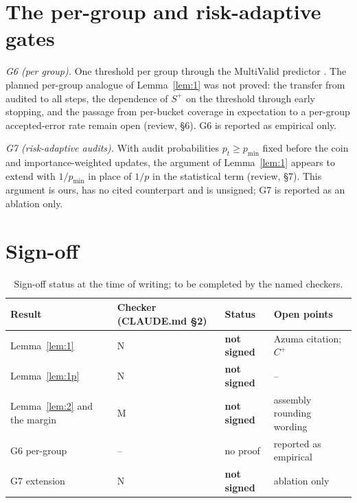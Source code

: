 \section{The per-group and risk-adaptive gates}
\emph{G6 (per group).} One threshold per group through the MultiValid predictor
\cite{bastani2022mvp}. The planned per-group analogue of Lemma~\ref{lem:1} was not proved: the
transfer from audited to all steps, the dependence of $S^+$ on the threshold through early
stopping, and the passage from per-bucket coverage in expectation to a per-group accepted-error
rate remain open (review, \S6). G6 is reported as empirical only.

\emph{G7 (risk-adaptive audits).} With audit probabilities $p_t\ge p_{\min}$ fixed before the
coin and importance-weighted updates, the argument of Lemma~\ref{lem:1} appears to extend with
$1/p_{\min}$ in place of $1/p$ in the statistical term (review, \S7). This argument is ours, has no
cited counterpart and is unsigned; G7 is reported as an ablation only.

\section{Sign-off}
\begin{table}[h]\centering\small
\begin{tabular}{llll}
\hline
Result & Checker (CLAUDE.md \S2) & Status & Open points \\
\hline
Lemma~\ref{lem:1} & N & \textbf{not signed} & Azuma citation; $C^+$ \\
Lemma~\ref{lem:1p} & N & \textbf{not signed} & -- \\
Lemma~\ref{lem:2} and the margin & M & \textbf{not signed} & assembly rounding wording \\
G6 per-group & -- & no proof & reported as empirical \\
G7 extension & N & \textbf{not signed} & ablation only \\
\hline
\end{tabular}
\caption{Sign-off status at the time of writing; to be completed by the named checkers.}
\label{tab:signoff}
\end{table}
